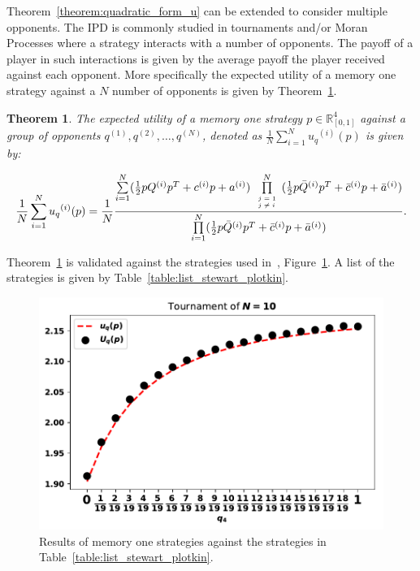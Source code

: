 \documentclass[10pt]{article}
\newtheorem{theorem}{Theorem}
\begin{document}
Theorem~\ref{theorem:quadratic_form_u} can be extended to consider multiple
opponents. The IPD is commonly studied in tournaments and/or Moran Processes
where a strategy interacts with a number of opponents. The payoff of a player in
such interactions is given by the average payoff the player received against
each opponent. More specifically the expected utility of a memory one strategy
against a \(N\) number of opponents is given by
Theorem~\ref{theorem:tournament_utility}.

\begin{theorem}\label{theorem:tournament_utility}
    The expected utility of a memory one strategy \(p\in\mathbb{R}_{[0,1]}^4\)
    against a group of opponents \(q^{(1)}, q^{(2)}, \dots, q^{(N)}\), denoted
    as \(\frac{1}{N} \sum\limits_{i=1} ^ {N} {u_q}^{(i)} (p)\) is given by:

    \begin{equation}\label{eq:tournament_utility}
        \frac{1}{N} \sum\limits_{i=1} ^ {N} {u_q}^{(i)} (p) = \frac{1}{N}
        \frac{\sum\limits_{i=1} ^ {N} (\frac{1}{2} pQ^{(i)} p^T + c^{(i)} p + a^ {(i)})
        \prod\limits_{\tiny\begin{array}{l} j=1 \\ j \neq i \end{array}} ^
        N (\frac{1}{2} p\bar{Q}^{(i)} p^T + \bar{c}^{(i)} p + \bar{a}^ {(i)})}
        {\prod\limits_{i=1} ^ N (\frac{1}{2} p\bar{Q}^{(i)} p^T + \bar{c}^{(i)} p + \bar{a}^ {(i)})}.
    \end{equation}
\end{theorem}

Theorem~\ref{theorem:tournament_utility} is validated against the strategies
used in~\cite{Stewart2012}, Figure~\ref{fig:stewart_plotkin_results}.
A list of the strategies is given by Table~\ref{table:list_stewart_plotkin}.



\begin{figure}[!htbp]
    \begin{center}
    \includegraphics[width=.5\linewidth]{img/Stewart_tournament_results.pdf}
    \caption{Results of memory one strategies against the strategies in
    Table~\ref{table:list_stewart_plotkin}.}
    \label{fig:stewart_plotkin_results}
    \end{center}
\end{figure}
\end{document}
